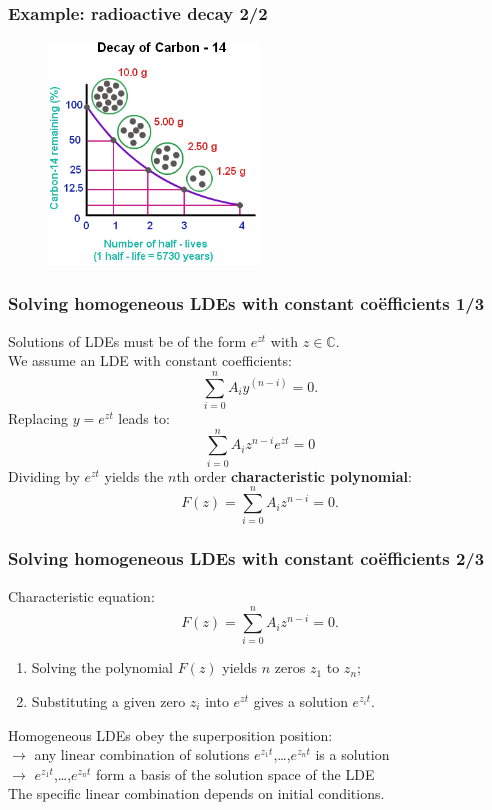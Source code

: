 \begin{frame}
\frametitle{Example: radioactive decay 2/2}
\begin{figure}
	\centering
	\includegraphics[width=0.5\textwidth]{decay-of-carbon-14.png}
\end{figure}
\end{frame}

\begin{frame}
\frametitle{Solving homogeneous LDEs with constant coëfficients 1/3}
Solutions of LDEs must be of the form $e^{zt}$ with $z \in \mathbb{C}$. \\
We assume an LDE with constant coefficients:
\begin{equation*}
\sum_{i=0}^n A_i y^{(n-i)} = 0.
\end{equation*}
Replacing $y = e^{zt}$ leads to:
\begin{equation*}
\sum_{i=0}^n A_i z^{n-i} e^{zt} = 0
\end{equation*}
Dividing by $e^{zt}$ yields the $n$th order \textbf{characteristic polynomial}:
\begin{equation*}
F(z) = \sum_{i=0}^n A_i z^{n-i} = 0.
\end{equation*}
\end{frame}

\begin{frame}
\frametitle{Solving homogeneous LDEs with constant coëfficients 2/3}
Characteristic equation:
\begin{equation*}
F(z) = \sum_{i=0}^n A_i z^{n-i} = 0.
\end{equation*}
\begin{enumerate}
\item Solving the polynomial $F(z)$ yields $n$ zeros $z_1$ to $z_n$;
\item Substituting a given zero $z_i$ into $e^{zt}$ gives a solution $e^{z_it}$.
\end{enumerate}
\vspace{1em}
Homogeneous LDEs obey the superposition position: \\
$\rightarrow$ any linear combination of solutions $e^{z_1t}$,\ldots,$e^{z_nt}$ is a solution \pause \\
$\rightarrow$ $e^{z_1t}$,\ldots,$e^{z_nt}$ form a basis of the solution space of the LDE \\
The specific linear combination depends on initial conditions.
\end{frame}

